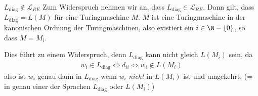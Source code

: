 \inlinetheorem $L_{\text{diag}} \notin \mathcal{L}_{RE}$
\inlineproof Zum Widerspruch nehmen wir an, dass $L_\text{diag} \in \mathcal{L}_{RE}$.
Dann gilt, dass $L_\text{diag} = L(M)$ für eine Turingmaschine $M$.
$M$ ist eine Turingmaschine in der kanonischen Ordnung der Turingmaschinen, also existiert ein $i \in \N - \{ 0 \}$, so dass $M = M_i$.

Dies führt zu einem Widerspruch, denn $L_\text{diag}$ kann nicht gleich $L(M_i)$ sein, da
\begin{align*}
    w_i \in L_\text{diag} \Longleftrightarrow d_{ii} \Longleftrightarrow w_i \notin L(M_i)
\end{align*}
also ist $w_i$ genau dann in $L_\text{diag}$ wenn $w_i$ \textit{nicht} in $L(M_i)$ ist und umgekehrt. (= in genau einer der Sprachen $L_\text{diag}$ oder $L(M_i)$)
